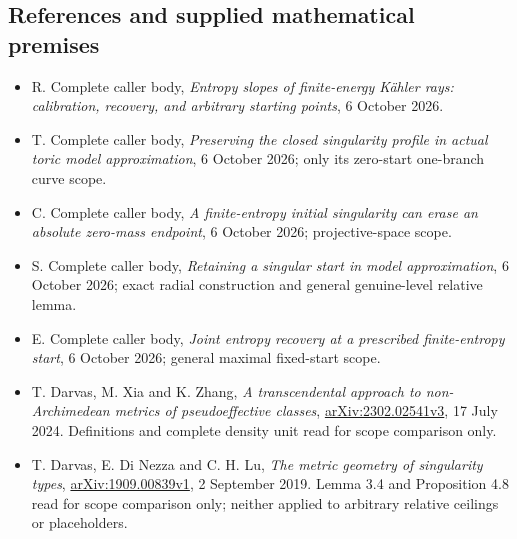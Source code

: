\documentclass[
  11pt,
]{article}
\providecommand{\tightlist}{%
  \setlength{\itemsep}{0pt}\setlength{\parskip}{0pt}}
\begin{document}
\subsection{References and supplied mathematical
premises}\label{references-and-supplied-mathematical-premises}

\begin{itemize}
\tightlist
\item
  R. Complete caller body, \emph{Entropy slopes of finite-energy Kähler
  rays: calibration, recovery, and arbitrary starting points}, 6 October
  2026.
\item
  T. Complete caller body, \emph{Preserving the closed singularity
  profile in actual toric model approximation}, 6 October 2026; only its
  zero-start one-branch curve scope.
\item
  C. Complete caller body, \emph{A finite-entropy initial singularity
  can erase an absolute zero-mass endpoint}, 6 October 2026;
  projective-space scope.
\item
  S. Complete caller body, \emph{Retaining a singular start in model
  approximation}, 6 October 2026; exact radial construction and general
  genuine-level relative lemma.
\item
  E. Complete caller body, \emph{Joint entropy recovery at a prescribed
  finite-entropy start}, 6 October 2026; general maximal fixed-start
  scope.
\item
  T. Darvas, M. Xia and K. Zhang, \emph{A transcendental approach to
  non-Archimedean metrics of pseudoeffective classes},
  \href{https://arxiv.org/pdf/2302.02541v3}{arXiv:2302.02541v3}, 17 July
  2024. Definitions and complete density unit read for scope comparison
  only.
\item
  T. Darvas, E. Di Nezza and C. H. Lu, \emph{The metric geometry of
  singularity types},
  \href{https://arxiv.org/pdf/1909.00839v1}{arXiv:1909.00839v1}, 2
  September 2019. Lemma 3.4 and Proposition 4.8 read for scope
  comparison only; neither applied to arbitrary relative ceilings or
  placeholders.
\end{itemize}
\end{document}
